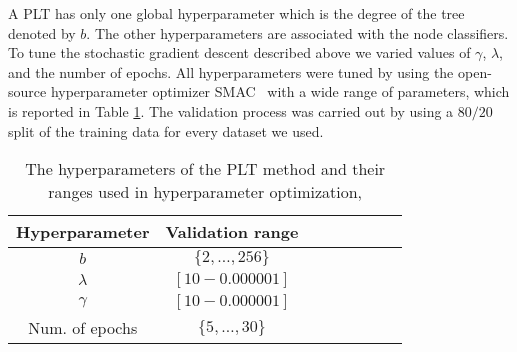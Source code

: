 \documentclass{article}
\newcommand{\Algo}[1]{\textsc{#1}}
\newcommand{\tableBefore}{-0pt}
\newcommand{\tableAfter}{-0pt}
\begin{document}
A \Algo{PLT} has only one global hyperparameter which is the degree of the tree denoted by $b$. The other hyperparameters are associated with the node classifiers. To tune the stochastic gradient descent described above we varied values of $\gamma$, $\lambda$, and the number of epochs. 
%
All hyperparameters were tuned by using the open-source hyperparameter optimizer \Algo{SMAC}~\cite{Hutter_et_al_2011} with a wide range of parameters, which is reported in Table \ref{tab:hyppar}. 
The validation process was carried out by using a $80/20$ split of the training data for every dataset we used.

\vspace{\tableBefore}
\begin{table}[ht!]
\caption{The hyperparameters of the \Algo{PLT} method and their ranges used in hyperparameter optimization,}
\label{tab:hyppar}
\begin{center}
\begin{tabular}{|c|c|c|c|c|c|c|c|}
\hline
Hyperparameter & Validation range \\%
\hline
$b$ & $\{2,\dots,256\}$ \\%
$\lambda$ &  $[10 - 0.000001]$ \\%
$\gamma$ &  $[10 - 0.000001]$ \\%
Num. of epochs &  $\{ 5, \dots , 30\} $ \\
\hline
\end{tabular}
\end{center}
\end{table}
\vspace{\tableAfter}
\end{document}
